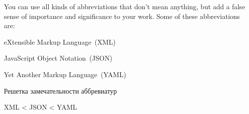 You can use all kinds of abbreviations that don't mean anything, but add
a false sense of importance and significance to your work. Some of these
abbreviations are:
%
\begin{itemize*}
    \item eXtensible Markup Language~(XML)
    \item JavaScript Object Notation~(JSON)
    \item Yet Another Markup Language~(YAML)
\end{itemize*}
%

\begin{table}
    \captionsetup{skip=5pt}
    \caption{Решетка замечательности аббревиатур}
    \centering
    XML < JSON < YAML
\end{table}

\Blindtext
